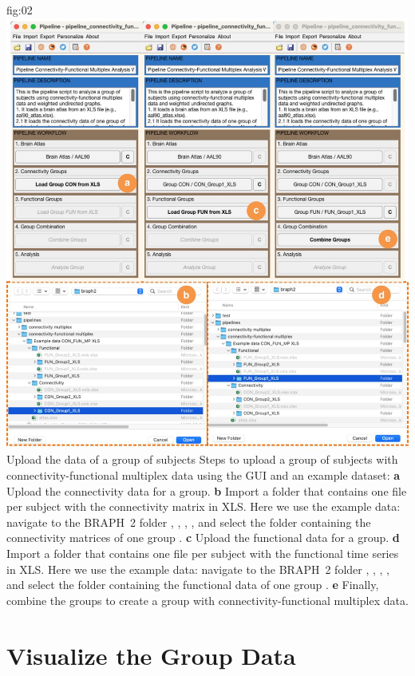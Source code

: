 \documentclass[justified]{tufte-handout}
\begin{document}
	{fig:02}
	{
	\includegraphics{fig02.jpg}
	}
	{Upload the data of a group of subjects}
	{
	Steps to upload a group of subjects with connectivity-functional multiplex data using the GUI and an example dataset: 
	{\bf a} Upload the connectivity data for a group.
	{\bf b} Import a folder that contains one file per subject with the connectivity matrix in XLS. Here we use the example data: navigate to the BRAPH~2 folder , ,  , , and select the folder containing the connectivity matrices of one group .
     {\bf c} Upload the functional data for a group.
 	{\bf d} Import a folder that contains one file per subject with the functional time series in XLS. Here we use the example data: navigate to the BRAPH~2 folder , ,  , , and select the folder containing the functional data of one group .
   {\bf e} Finally, combine the groups to create a group with connectivity-functional multiplex data.
	}


\section{Visualize the Group Data}
\end{document}
